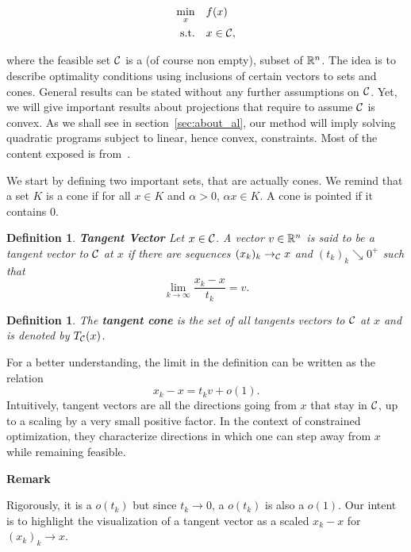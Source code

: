 \documentclass[10pt]{article}
\newtheorem{definition}[theorem]{Definition}
\numberwithin{equation}{section}
\begin{document}
	\begin{equation}
		\label{eq:math_prog_geom}
		\begin{aligned}
			\min_x \quad & f(x) \\
			\text{s.t.} \quad & x \in {\mathcal{C}},
		\end{aligned}
	\end{equation}
	
	where the feasible set ${\mathcal{C}}$ is a (of course non empty), subset of ${\mathbb{R}}^n$. The idea is to describe optimality conditions using inclusions of certain vectors to sets and cones. General results can be stated without any further assumptions on ${\mathcal{C}}$. Yet, we will give important results about projections that require to assume ${\mathcal{C}}$ is convex. As we shall see in section~\ref{sec:about_al}, our method will imply solving quadratic programs subject to linear, hence convex, constraints. Most of the content exposed is from~\cite[][Chapter 12]{nocedalwright:2006}.
	
	We start by defining two important sets, that are actually cones. We remind that a set $K$ is a cone if for all $x \in K$ and $\alpha >0 $, $\alpha x\in K $. A cone is pointed if it contains $0$.
	
	\begin{definition}\textbf{Tangent Vector}
		Let $x\in {\mathcal{C}}$. A vector $v\in {\mathbb{R}}^n$ is said to be a tangent vector to ${\mathcal{C}}$  at $x$ if there are sequences $(x_k)_k \to_{\mathcal{C}} x$ and $(t_k)_k \searrow 0^+$ such that 
		\[\lim\limits_{k\to \infty} \dfrac{x_k-x}{t_k}=v.\]
	\end{definition}
	
	\begin{definition}
		
	The \textbf{tangent cone} is the set of all tangents vectors to ${\mathcal{C}}$ at $x$ and is denoted by $T_{\mathcal{C}}(x)$.
	\end{definition}
	
	For a better understanding, the limit in the definition can be written as the relation
	\[x_k - x = t_kv + o(1).\]
	Intuitively, tangent vectors are all the directions going from $x$ that stay in ${\mathcal{C}}$, up to a scaling by a very small positive factor. In the context of constrained optimization, they characterize directions in which one can step away from $x$ while remaining feasible. 
	
	\textbf{Remark} 
	
	Rigorously, it is a $o(t_k)$ but since $t_k \to 0$, a $o(t_k)$ is also a $o(1)$. Our intent is to highlight the  visualization of a tangent vector as a scaled $x_k-x$ for $(x_k)_k \to x$.
	
\end{document}
